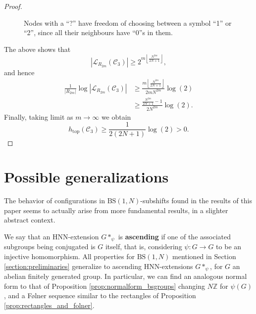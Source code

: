 \documentclass[letterpaper,10pt]{amsart}
\theoremstyle{plain}
\newcommand{\BS}[1][N]{\mathrm{BS}(1,#1)}
\def\htop{h_{\mathrm{top}}}
\begin{document}
\begin{proof}
\begin{figure}[H]
		\caption{Nodes with a ``?'' have freedom of choosing between a symbol ``1'' or ``2'', since all their neighbours have ``0''s in them.}
	\end{figure}
	
	The above shows that
	$$
	|\mathcal{L}_{R_{2m}}(\mathcal{C}_3)|\ge 2^{m\left\lfloor \frac{N^{2m}}{2N+1}\right\rfloor },
	$$
	and hence
	\begin{align*}
	\frac{1}{|R_{2m}|}\log |\mathcal{L}_{R_{2m}}(\mathcal{C}_3)|&\ge\frac{m\left\lfloor \frac{N^{2m}}{2N+1}\right\rfloor}{2mN^{2m}}\log(2) \\
	&\ge \frac{\frac{N^{2m}}{2N+1}-1}{2N^{2m}}\log(2).
	\end{align*}
	Finally, taking limit as $m\to\infty$ we obtain
	$$
	\htop(\mathcal{C}_3)\ge \frac{1}{2(2N+1)}\log(2)>0.
	$$
\end{proof}	

\section{Possible generalizations}
		The behavior of configurations in $\BS$-subshifts found in the results of this paper seems to actually arise from more fundamental results, in a slighter abstract context.
		
		We say that an HNN-extension $G*_{\psi}$ is \textbf{ascending} if one of the associated subgroups being conjugated is $G$ itself, that is, considering $\psi:G\to G$ to be an injective homomorphism. All properties for $\BS$ mentioned in Section \ref{section:preliminaries} generalize to ascending HNN-extensions $G*_{\psi}$, for $G$ an abelian finitely generated group. In particular, we can find an analogous normal form to that of Proposition \ref{prop:normalform_bsgroups} changing $N\mathbb{Z}$ for $\psi(G)$, and a F\o lner sequence similar to the rectangles of Proposition \ref{prop:rectangles_and_folner}.
		
\end{document}
